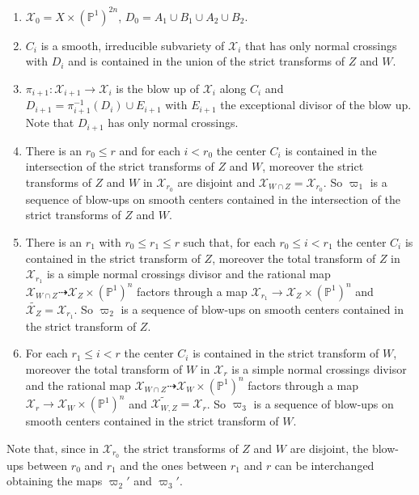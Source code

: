 \documentclass[11pt,a4paper]{amsart}
\renewcommand{\P}{\mathds{P}}
\newcommand{\caX}{\mathcal{X}}
\numberwithin{equation}{section}
\theoremstyle{plain}
\theoremstyle{definition}
\begin{document}
\begin{enumerate}
\item $\caX_{0}=X\times (\P^{1})^{2n}$, $D_{0}=A_{1}\cup B_{1}\cup
  A_{2}\cup B_{2}$.
  
\item $C_{i}$ is a smooth, irreducible subvariety of $\caX_{i}$ that
  has only normal crossings with 
  $D_{i}$ and is contained in the union of the strict
  transforms of $Z$ and $W$.
  
\item $\pi _{i+1}\colon \caX_{i+1}\to \caX_{i}$ is the blow up of
  $\caX_{i}$ along $C_{i}$ and $D_{i+1}=\pi _{i+1}^{-1}(D_{i})\cup
  E_{i+1}$ with $E_{i+1}$ the exceptional divisor of the blow up. Note
  that $D_{i+1}$ has only normal crossings.
  
\item There is an $r_{0}\le r$ and for each $i< r_{0}$ the center
  $C_{i}$ is contained in the intersection of the strict transforms of
  $Z$ and $W$, moreover the strict
  transforms of $Z$ and $W$ in  $\caX_{r_0}$ are disjoint and
  $\caX_{W\cap Z}=\caX_{r_0}$. So $\varpi _1$ is a sequence  of blow-ups
  on smooth centers contained in the intersection of the strict
  transforms of $Z$ and $W$. 

  \item There is an $r_{1}$ with $r_0\le r_1\le r$ such that, for each
    $r_0\le i< r_{1}$ the center $C_{i}$ is contained in the strict transform of
  $Z$, moreover the total transform 
  of $Z$ in $\caX_{r_1}$ is a simple normal crossings divisor and the
  rational map $\caX_{W\cap Z}\dashrightarrow \caX_Z\times (\P^1)^{n}$
  factors through a map $\caX_{r_1}\to \caX_Z\times (\P^1)^{n}$ and   
$\widetilde {\caX_{Z}}=\caX_{r_1}$. So $\varpi _2$ is a sequence  of blow-ups
  on smooth centers contained in the strict
  transform of $Z$. 

  \item For each
    $r_1\le i< r$ the center $C_{i}$ is contained in the strict transform of
  $W$, moreover the total transform 
  of $W$ in $\caX_{r}$ is a simple normal crossings divisor and the
  rational map $\caX_{W\cap Z}\dashrightarrow \caX_W\times (\P^1)^{n}$
  factors through a map $\caX_{r}\to \caX_W\times (\P^1)^{n}$ and   
$\widetilde {\caX_{W,Z}}=\caX_{r}$. So $\varpi _3$ is a sequence of blow-ups
  on smooth centers contained in the strict
  transform of $W$.   
\end{enumerate}
Note that, since in $\caX_{r_0}$ the strict transforms of $Z$ and $W$
are disjoint, the blow-ups between $r_0$ and $r_1$ and the ones
between $r_1$ and $r$ can be interchanged obtaining the maps
$\varpi _2'$ and $\varpi _3'$. 
\end{document}
